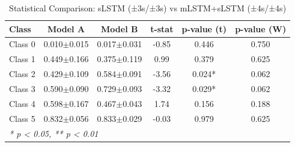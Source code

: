 \begin{table}[htbp]
\centering
\caption{Statistical Comparison: sLSTM (±3s/±3s) vs mLSTM+sLSTM (±4s/±4s)}
\label{tab:comparison_class_slstm_±3s_±3s_vs_mlstmslstm_±4s_±4s}
\begin{tabular}{lccccc}
\toprule
\textbf{Class} & \textbf{Model A} & \textbf{Model B} & \textbf{t-stat} & \textbf{p-value (t)} & \textbf{p-value (W)} \\
\midrule
Class 0 & 0.010$\pm$0.015 & 0.017$\pm$0.031 & -0.85 & 0.446 & 0.750 \\
Class 1 & 0.449$\pm$0.166 & 0.375$\pm$0.119 & 0.99 & 0.379 & 0.625 \\
Class 2 & 0.429$\pm$0.109 & 0.584$\pm$0.091 & -3.56 & 0.024* & 0.062 \\
Class 3 & 0.590$\pm$0.090 & 0.729$\pm$0.093 & -3.32 & 0.029* & 0.062 \\
Class 4 & 0.598$\pm$0.167 & 0.467$\pm$0.043 & 1.74 & 0.156 & 0.188 \\
Class 5 & 0.832$\pm$0.056 & 0.833$\pm$0.029 & -0.03 & 0.979 & 0.625 \\
\bottomrule
\multicolumn{6}{l}{\textit{* p < 0.05, ** p < 0.01}} \\
\end{tabular}
\end{table}